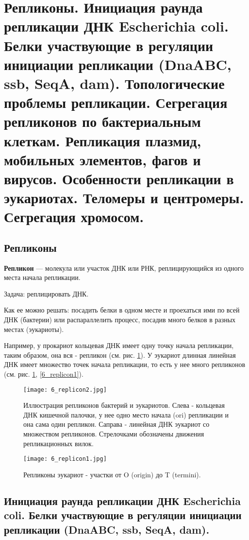 \section{Репликоны.
Инициация раунда репликации ДНК Escherichia coli. Белки участвующие в регуляции инициации 
репликации (DnaABC, ssb, SeqA, dam).
Топологические проблемы репликации. Сегрегация репликонов по бактериальным клеткам.
Репликация плазмид, мобильных элементов, фагов и вирусов.
Особенности репликации в эукариотах. Теломеры и центромеры. Сегрегация хромосом.}

\subsection{Репликоны}

\textbf{Репликон} — молекула или участок ДНК или РНК, реплицирующийся из одного места начала репликации.

Задача: реплицировать ДНК. 

Как ее можно решать: посадить белки в одном месте и проехаться ими по всей ДНК (бактерии) или распараллелить процесс, посадив много белков в разных местах (эукариоты).

Например, у прокариот кольцевая ДНК имеет одну точку начала репликации, таким образом, она вся - репликон (см. рис. \ref{fig:6_replicon2}). У эукариот длинная линейная ДНК имеет множество точек начала репликации, то есть у нее много репликонов (см. рис. \ref{fig:6_replicon2}, \ref{6_replicon1}).

\begin{figure}[H]
    \centering
    \texttt{[image: 6\_replicon2.jpg]}
    \caption{Иллюстрация репликонов бактерий и эукариотов. Слева - кольцевая ДНК кишечной палочки, у нее одно место начала (ori) репликации и она сама один репликон. Саправа - линейная ДНК эукариот со множеством репликонов. Стрелочками обозначены движения репликационных вилок.}
    \label{fig:6_replicon2}
\end{figure}

\begin{figure}
    \centering
    \texttt{[image: 6\_replicon1.jpg]}
    \caption{Репликоны эукариот - участки от O (origin) до T (termini).}
    \label{fig:6_replicon1}
\end{figure}

\subsection{Инициация раунда репликации ДНК Escherichia coli. Белки участвующие в регуляции инициации 
репликации (DnaABC, ssb, SeqA, dam).}

